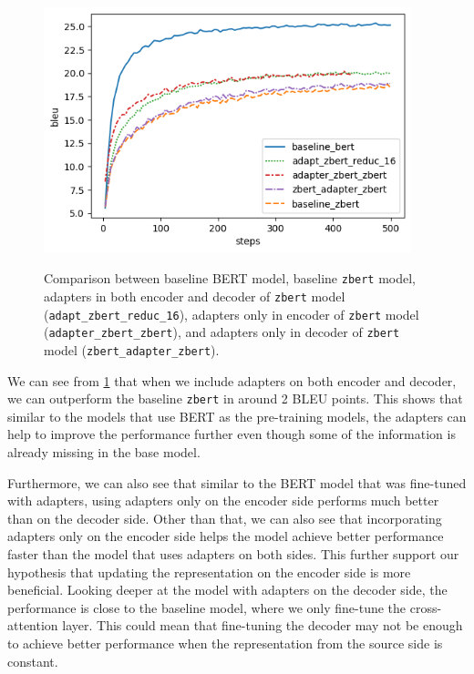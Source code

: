 \begin{figure}[h]
    {\includegraphics[width=0.95\textwidth]{img/zbert_pos.png}}
    \centering
    \caption[Comparison between baseline BERT and \texttt{zbert} models.]{Comparison between baseline BERT model, baseline \texttt{zbert} model, adapters in both encoder and decoder of \texttt{zbert} model (\texttt{adapt\_zbert\_reduc\_16}), adapters only in encoder of \texttt{zbert} model (\texttt{adapter\_zbert\_zbert}), and adapters only in decoder of \texttt{zbert} model (\texttt{zbert\_adapter\_zbert}).}
    \label{img:zbert_pos}
\end{figure}

We can see from \cref{img:zbert_pos} that when we include adapters on both encoder and decoder, we can outperform the baseline \texttt{zbert} in around 2 BLEU points. This shows that similar to the models that use BERT as the pre-training models, the adapters can help to improve the performance further even though some of the information is already missing in the base model.

Furthermore, we can also see that similar to the BERT model that was fine-tuned with adapters, using adapters only on the encoder side performs much better than on the decoder side. Other than that, we can also see that incorporating adapters only on the encoder side helps the model achieve better performance faster than the model that uses adapters on both sides. This further support our hypothesis that updating the representation on the encoder side is more beneficial. Looking deeper at the model with adapters on the decoder side, the performance is close to the baseline model, where we only fine-tune the cross-attention layer. This could mean that fine-tuning the decoder may not be enough to achieve better performance when the representation from the source side is constant.

